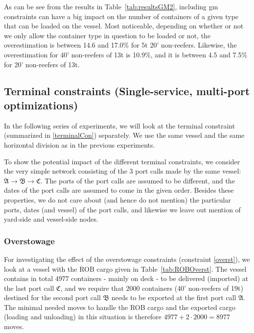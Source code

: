 
As can be see from the results in Table~\ref{tab:resultsGM2}, including gm constraints can have a big impact on the number of containers of a given type that can be loaded on the vessel. Most noticeable, depending on whether or not we only allow the container type in question to be loaded or not, %
the overestimation is between 14.6 and 17.0\% for 5t 20' non-reefers. Likewise, the overestimation for 40' non-reefers of 13t is %
10.9\%, and it is between 4.5 and 7.5\% for 20' non-reefers of 13t. %

\subsection{Terminal constraints (Single-service, multi-port optimizations)}
In the following series of experiments, we will look at the terminal constraint (summarized in \eqref{terminalCon}) separately. We use the same vessel and the same horizontal division as in the previous experiments.  

To show the potential impact of the different terminal constraints, we consider the very simple network consisting of the 3 port calls made by the same vessel: $\mathfrak{A} \rightarrow \mathfrak{B} \rightarrow \mathfrak{C}$. The ports of the port calls are assumed to be different, and the dates of the port calls are assumed to come in the given order. Besides these properties, we do not care about (and hence do not mention) the particular ports, dates (and vessel) of the port calls, and likewise we leave out mention of yard-side and vessel-side nodes. 

\subsubsection{Overstowage}
For investigating the effect of the overstowage constraints (constraint \eqref{overst}), we look at a vessel with the ROB cargo given in Table~\ref{tab:ROBOverst}. The vessel contains in total 4977 containers - mainly on deck - to be delivered (imported) at the last port call $\mathfrak{C}$, and we require that 2000 containers (40' non-reefers of 19t) destined for the second port call $\mathfrak{B}$ needs to be exported at the first port call $\mathfrak{A}$. The minimal needed moves to handle the ROB cargo and the exported cargo (loading and unloading) in this situation is therefore $4977 + 2\cdot 2000 = 8977$ moves.%

